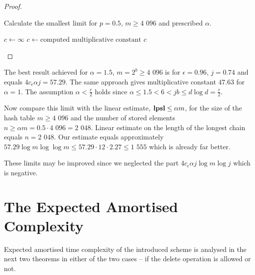 \begin{proof}
\begin{algorithm}[H]
\caption{Calculate the smallest limit for $p=0.5$, $m \geq \text{4 096}$ and prescribed $\alpha$.}
\label{algorithm-scheme-3}
\begin{algorithmic}
\STATE $c \leftarrow \infty$
				\STATE $c \leftarrow \text{computed multiplicative constant}$
			\ENDIF
		\ENDFOR
	\ENDFOR
\ENDFOR
\STATE
\RETURN $c$
\end{algorithmic}
\end{algorithm}
\end{proof}

The best result achieved for $\alpha = 1.5$, $m = 2 ^ b \geq \text{4 096}$ is for $\epsilon = 0.96$, $j = 0.74$ and equals $4 c_\epsilon \alpha j = 57.29$. The same approach gives multiplicative constant $47.63$ for $\alpha = 1$. The assumption $\alpha < \frac{r}{2}$ holds since $\alpha \leq 1.5 < 6 < jb \leq d \log d = \frac{r}{2}$.

Now compare this limit with the linear estimate, $\mathbf{lpsl} \leq \alpha m$, for the size of the hash table $m \geq \text{4 096}$ and the number of stored elements $n \geq \alpha m = 0.5 \cdot \text{4 096} = \text{2 048}$. Linear estimate on the length of the longest chain equals $n = \text{2 048}$. Our estimate equals approximately $57.29 \log m \log \log m \leq 57.29 \cdot 12 \cdot 2.27 \leq \text{1 555}$ which is already far better. 

These limits may be improved since we neglected the part $4 c_\epsilon \alpha j \log m \log j$ which is negative.

\section{The Expected Amortised Complexity}
Expected amortised time complexity of the introduced scheme is analysed in the next two theorems in either of the two cases -- if the delete operation is allowed or not.

